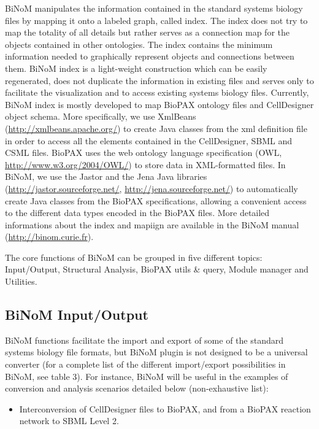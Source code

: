 \documentclass[10pt]{bmc_article}
\newenvironment{bmcformat}{\baselineskip20pt\sloppy\setboolean{publ}{false}}{\baselineskip20pt\sloppy}
\begin{document}
\begin{bmcformat}
BiNoM manipulates the information contained in the standard systems biology
files by mapping it onto a labeled graph, called index. The index does not try
to map the totality of all details but rather serves as a connection map for the
objects contained in other ontologies. The index contains the minimum
information needed to graphically represent objects and connections between
them. BiNoM index is a light-weight construction which can be easily
regenerated, does not duplicate the information in existing files and serves
only to facilitate the visualization and to access existing systems biology
files. Currently, BiNoM index is mostly developed to map BioPAX ontology files
and CellDesigner object schema. More specifically, we use XmlBeans
(\url{http://xmlbeans.apache.org/}) to create Java classes from the xml definition file in
order to access all the elements contained in the CellDesigner, SBML and CSML files.
BioPAX uses the web ontology language specification (OWL,
\url{http://www.w3.org/2004/OWL/}) to store data in XML-formatted files. In
BiNoM, we use the Jastor and the Jena Java libraries
(\url{http://jastor.sourceforge.net/}, \url{http://jena.sourceforge.net/}) to
automatically create Java classes from the BioPAX specifications, allowing a
convenient access to the different data types encoded in the BioPAX files. More
detailed informations about the index and mapiign are available in the BiNoM
manual (\url{http://binom.curie.fr}).

The core functions of BiNoM can be grouped in five different topics: Input/Output,
Structural Analysis, BioPAX utils \& query, Module manager and Utilities.

\subsection*{BiNoM Input/Output}

BiNoM functions facilitate the import and export of some of the standard systems
biology file formats, but BiNoM plugin is not designed to be a universal
converter (for a complete list of the different import/export possibilities in
BiNoM, see table 3).
For instance, BiNoM will be useful in the examples of conversion and analysis
scenarios detailed below (non-exhaustive list):

\begin{itemize}

\item Interconversion of CellDesigner files to BioPAX, and from a BioPAX
reaction network to SBML Level 2.


\end{itemize}
\end{bmcformat}
\end{document}
